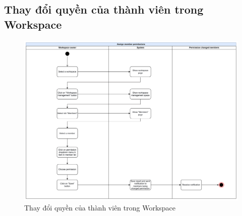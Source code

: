 \subsection{Thay đổi quyền của thành viên trong Workspace}
    \begin{figure}[H]
        \centering
        \includegraphics[width=\linewidth]{Content/Phân tích và thiết kế hệ thống/documents/Sơ đồ hoạt động/images/adjustMemberPermissions.png}
        \vspace{0.5cm}
        \caption{Thay đổi quyền của thành viên trong Workspace}
        \label{fig:Thay đổi quyền của thành viên trong Workspace}
    \end{figure}